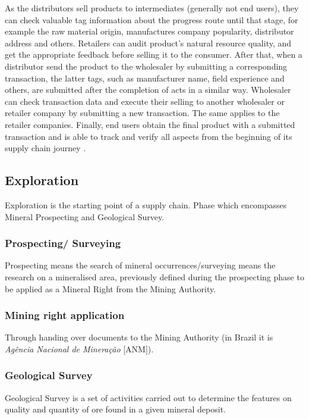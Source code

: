 As the distributors sell products to intermediates (generally not end users), they can check valuable tag information about the progress route until that stage, for example the raw material origin, manufactures company popularity, distributor address and others. Retailers can audit product's natural resource quality, and get the appropriate feedback before selling it to the consumer. After that, when a distributor send the product to the wholesaler by submitting a corresponding transaction, the latter tags, such as manufacturer name, field experience and others, are submitted after the completion of acts in a similar way. Wholesaler can check transaction data and execute their selling to another wholesaler or retailer company by submitting a new transaction. The same applies to the retailer companies. Finally, end users obtain the final product with a submitted transaction and is able to track and verify all aspects from the beginning of its supply chain journey \cite{litke2019blockchains}. 

\subsection{Exploration}\label{sec:Exploration}
Exploration is the starting point of a supply chain. Phase which encompasses Mineral Prospecting and Geological Survey.

\subsubsection{Prospecting/ Surveying}\label{sec:Prospecting}
Prospecting means the search of mineral occurrences/surveying means the research on a mineralised area, previously defined during the prospecting phase to be applied as a Mineral Right from the Mining Authority.

\subsubsection{Mining right application}\label{sec:Mining}
Through handing over documents to the Mining Authority (in Brazil it is \textit{Agência Nacional de Mineração} [ANM]).

\subsubsection{Geological Survey}\label{sec:GeologicalSurvey}
Geological Survey is a set of activities carried out to determine the features on quality and quantity of ore found in a given mineral deposit.

